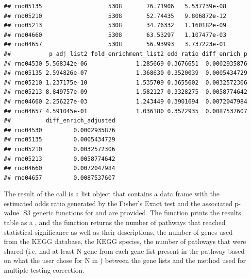 \documentclass[article]{jss}\usepackage[]{graphicx}\usepackage[]{color}
\makeatletter
\newenvironment{kframe}{%
 \def\at@end@of@kframe{}%
 \ifinner\ifhmode%
  \def\at@end@of@kframe{\end{minipage}}%
  \begin{minipage}{\columnwidth}%
 \fi\fi%
 \def\FrameCommand##1{\hskip\@totalleftmargin \hskip-\fboxsep
 \colorbox{shadecolor}{##1}\hskip-\fboxsep
     \hskip-\linewidth \hskip-\@totalleftmargin \hskip\columnwidth}%
 \MakeFramed {\advance\hsize-\width
   \@totalleftmargin\z@ \linewidth\hsize
   \@setminipage}}%
 {\par\unskip\endMakeFramed%
 \at@end@of@kframe}
\newenvironment{knitrout}{}{} %
\makeatother
\begin{document}
\begin{knitrout}
\begin{kframe}
\begin{verbatim}
## rno05135                   5308       76.71906   5.537739e-08
## rno05210                   5308       52.74435   9.806872e-12
## rno05213                   5308       34.76332   1.160182e-09
## rno04660                   5308       63.53297   1.107477e-03
## rno04657                   5308       56.93993   3.737223e-01
##           p_adj_list2 fold_enrichment_list2 odd_ratio diff_enrich_p
## rno04530 5.568342e-06              1.285669 0.3676651  0.0002935876
## rno05135 2.594826e-07              1.368630 0.3520039  0.0005434729
## rno05210 1.237175e-10              1.535709 0.3655602  0.0032572306
## rno05213 8.849757e-09              1.582127 0.3328275  0.0058774642
## rno04660 2.256227e-03              1.243449 0.3901694  0.0072047984
## rno04657 4.591045e-01              1.036180 0.3572935  0.0087537607
##          diff_enrich_adjusted
## rno04530         0.0002935876
## rno05135         0.0005434729
## rno05210         0.0032572306
## rno05213         0.0058774642
## rno04660         0.0072047984
## rno04657         0.0087537607
\end{verbatim}
\end{kframe}
\end{knitrout}

The result of the  call is a list object that
contains a data frame with the estimated odds ratio generated
by the Fisher's Exact test and the associated p-value. S3 generic
functions for  and  are provided. The
 function prints the results table as a ,
and the  function returns the number of pathways
that reached statistical significance as well as their descriptions,
the number of genes used from the KEGG database, the KEGG species,
the number of pathways that were shared (i.e. had at least N gene
from each gene list present in the pathway based on what the user
chose for N in ) between the gene lists and the
method used for multiple testing correction.
\end{document}
